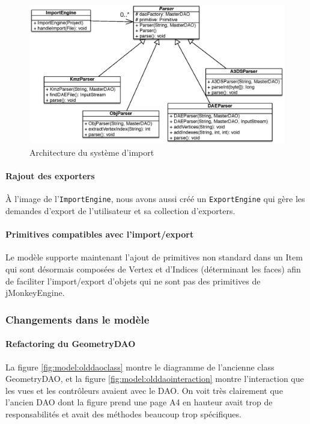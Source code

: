 		\begin{figure}
			\center
			\includegraphics[width=\textwidth]{iteration3/fig/ParsersArchi.eps}
			\caption{\label{fig:model:parsersarchi} Architecture du système d'import}
		\end{figure}

		\paragraph{Rajout des exporters}
		À l'image de l'\texttt{ImportEngine}, nous avons aussi créé un 
		\texttt{ExportEngine} qui gère les demandes d'export de l'utilisateur et
		sa collection d'exporters.

		\paragraph{Primitives compatibles avec l'import/export}
		Le modèle supporte maintenant l'ajout de primitives non standard dans un
		Item qui sont désormais composées de Vertex et d'Indices (déterminant 
		les faces) afin de faciliter l'import/export d'objets qui ne sont pas des
		primitives de jMonkeyEngine.

	\subsubsection{Changements dans le modèle}

		\paragraph{Refactoring du GeometryDAO}
		La figure \ref{fig:model:olddaoclass} montre le diagramme de l'ancienne
		class GeometryDAO, et la figure \ref{fig:model:olddaointeraction} montre
		l'interaction que les vues et les contrôleurs avaient avec le DAO. On
		voit très clairement que l'ancien DAO dont la figure prend une page A4
		en hauteur avait trop de responsabilités et avait des méthodes beaucoup
		trop spécifiques.\\

